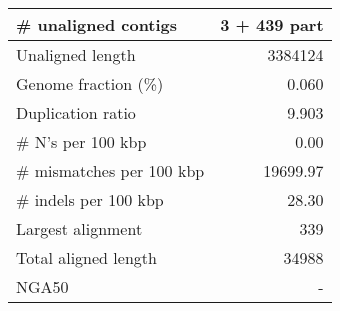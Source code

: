 \documentclass[12pt,a4paper]{article}
\begin{document}
\begin{table}[ht]
\begin{center}
\begin{tabular}{|l*{1}{|r}|}
\# unaligned contigs & 3 + 439 part \\ \hline
Unaligned length & 3384124 \\ \hline
Genome fraction (\%) & 0.060 \\ \hline
Duplication ratio & 9.903 \\ \hline
\# N's per 100 kbp & 0.00 \\ \hline
\# mismatches per 100 kbp & 19699.97 \\ \hline
\# indels per 100 kbp & 28.30 \\ \hline
Largest alignment & 339 \\ \hline
Total aligned length & 34988 \\ \hline
NGA50 & - \\ \hline
\end{tabular}
\end{center}
\end{table}
\end{document}

